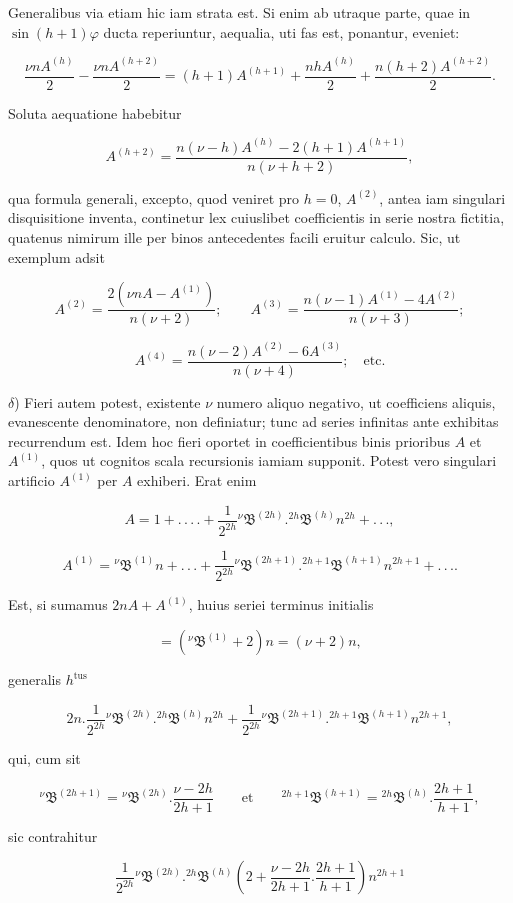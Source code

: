 \noindent Generalibus via etiam hic iam strata est. Si enim ab utraque parte, quae in
$\sin(h+1)\varphi$ ducta reperiuntur, aequalia, uti fas est, ponantur, eveniet:

\[
\frac{\nu nA^{(h)}}{2}-\frac{\nu nA^{(h+2)}}{2}=(h+1)A^{(h+1)}+\frac{nhA^{(h)}}{2}+\frac{n(h+2)A^{(h+2)}}{2}.
\]

\noindent Soluta aequatione habebitur

\[
A^{(h+2)}=\frac{n(\nu-h)A^{(h)}-2(h+1)A^{(h+1)}}{n(\nu+h+2)},
\]

\noindent qua formula generali, excepto, quod veniret pro $h=0$, $A^{(2)}$, antea iam singulari
disquisitione inventa, continetur lex cuiuslibet coefficientis in serie nostra fictitia,
quatenus nimirum ille per binos antecedentes facili eruitur calculo. Sic, ut exemplum
adsit

\[
A^{(2)}=\frac{2(\nu nA-A^{(1)})}{n(\nu+2)};\qquad A^{(3)}=\frac{n(\nu-1)A^{(1)}-4A^{(2)}}{n(\nu+3)};
\]

\[
A^{(4)}=\frac{n(\nu-2)A^{(2)}-6A^{(3)}}{n(\nu+4)};\quad\mbox{etc.}
\]

$\delta$) Fieri autem potest, existente $\nu$ numero aliquo negativo, ut coefficiens
aliquis, evanescente denominatore, non definiatur; tunc ad series infinitas ante
exhibitas recurrendum est. Idem hoc fieri oportet in coefficientibus binis prioribus $A$
et $A^{(1)}$, quos ut cognitos scala recursionis iamiam supponit. Potest vero singulari
artificio $A^{(1)}$ per $A$ exhiberi. Erat enim

\[
A=1+.\,.\,.\,.+\frac{1}{2^{2h}}{}^{\nu}\mathfrak{B}^{(2h)}.{}^{2h}\mathfrak{B}^{(h)}n^{2h}+.\,.\,.,
\]

\[
A^{(1)}={}^{\nu}\mathfrak{B}^{(1)}n+.\,.\,.+\frac{1}{2^{2h}}{}^{\nu}\mathfrak{B}^{(2h+1)}.{}^{2h+1}\mathfrak{B}^{(h+1)}n^{2h+1}+.\,.\,..
\]

\noindent Est, si sumamus $2nA+A^{(1)}$, huius seriei terminus initialis

\[
=({}^{\nu}\mathfrak{B}^{(1)}+2)n=(\nu+2)n,
\]

\noindent generalis $h^{\text{tus}}$

\[
2n . \frac{1}{2^{2h}}{}^{\nu}\mathfrak{B}^{(2h)}.{}^{2h}\mathfrak{B}^{(h)}n^{2h}+\frac{1}{2^{2h}}{}^{\nu}\mathfrak{B}^{(2h+1)}.{}^{2h+1}\mathfrak{B}^{(h+1)}n^{2h+1},
\]

\noindent qui, cum sit

\[
{}^{\nu}\mathfrak{B}^{(2h+1)}={}^{\nu}\mathfrak{B}^{(2h)} . \frac{\nu-2h}{2h+1}\qquad\mbox{et}\qquad {}^{2h+1}\mathfrak{B}^{(h+1)}={}^{2h}\mathfrak{B}^{(h)} . \frac{2h+1}{h+1},
\]

\noindent sic contrahitur

\[
\frac{1}{2^{2h}}{}^{\nu}\mathfrak{B}^{(2h)}.{}^{2h}\mathfrak{B}^{(h)}\left(2+\frac{\nu-2h}{2h+1} . \frac{2h+1}{h+1}\right)n^{2h+1}
\]

